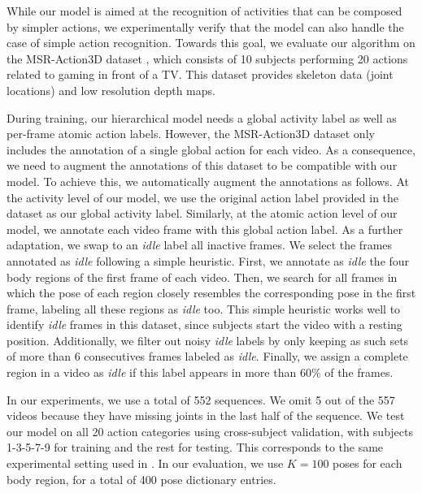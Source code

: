 
While our model is aimed at the recognition of activities that can be composed by simpler actions,
we experimentally verify that the model can also handle the case of simple action recognition.
Towards this goal, we evaluate our algorithm on the MSR-Action3D dataset \cite{WanLi2010},
which consists of 10 subjects performing 20 actions related to gaming in front of a TV.
This dataset provides skeleton data (joint locations) and low resolution depth maps.

During training, our hierarchical model needs 
a global activity label as well as per-frame atomic action labels. However, the MSR-Action3D 
dataset only includes the annotation of a single global action for each video. As a consequence, 
we need to augment the annotations of this dataset to be compatible with our model. To achieve 
this, we automatically augment the annotations as follows. At the activity level of our model, we 
use the original action label provided in the dataset as our global activity
label. Similarly, at the atomic action level of our model, 
we annotate each video frame with this global action label. As a further adaptation, we swap to an
\emph{idle} label all inactive frames. We select the frames annotated as \emph{idle} following a 
simple heuristic. First, we annotate as 
\emph{idle} the four body regions of the first frame of each video. Then, we search for all frames 
in which the pose of each region closely resembles the corresponding pose in
the first frame, labeling all these regions as \emph{idle} too. This simple heuristic works well to 
identify \emph{idle}
frames in this dataset, since subjects start the video
with a resting position. Additionally, we filter out noisy \emph{idle} labels by 
only keeping as such sets of more than 6 consecutives frames labeled as \emph{idle}. Finally, 
we assign a complete region in a video as \emph{idle} if this label appears in more than 60\% of 
the 
frames.

In our experiments, we use a total of 552 sequences.
We omit 5 out of the 557 videos because they have missing joints in
the last half of the sequence.
We test our model on all 20 action categories using cross-subject validation,
with subjects 1-3-5-7-9 for training and the rest for testing.
This corresponds to the same experimental setting used in \cite{Wang2012}.
In our evaluation, we use $K=100$ poses for each body region, for a total of 400 pose 
dictionary entries.

